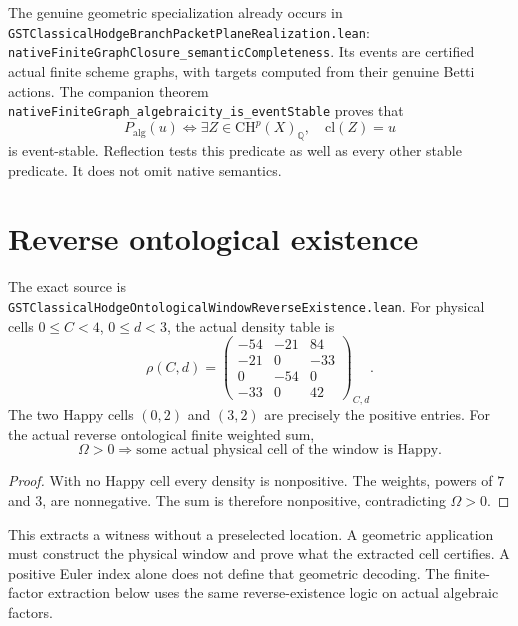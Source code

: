 \documentclass[11pt]{article}
\newcommand{\Q}{\mathbb Q}
\newcommand{\CH}{\mathrm{CH}}
\newcommand{\cl}{\mathrm{cl}}
\begin{document}
The genuine geometric specialization already occurs in
\texttt{GSTClassicalHodgeBranchPacketPlaneRealization.lean}:
\texttt{nativeFiniteGraphClosure\_semanticCompleteness}.
Its events are certified actual finite scheme graphs, with targets
computed from their genuine Betti actions.
The companion theorem
\texttt{nativeFiniteGraph\_algebraicity\_is\_eventStable}
proves that
\[
 P_{\mathrm{alg}}(u)
   \iff \exists Z\in\CH^p(X)_\Q,\quad \cl(Z)=u                 \tag{2}
\]
is event-stable. Reflection tests this predicate as well as every
other stable predicate. It does not omit native semantics.

\section{Reverse ontological existence}
The exact source is
\texttt{GSTClassicalHodgeOntologicalWindowReverseExistence.lean}.
For physical cells $0\le C<4$, $0\le d<3$, the actual density table is
\[
 \rho(C,d)=
 \begin{pmatrix}
 -54&-21&84\\
 -21&0&-33\\
 0&-54&0\\
 -33&0&42
 \end{pmatrix}_{C,d}.
\]
The two Happy cells $(0,2)$ and $(3,2)$ are precisely the positive
entries. For the actual reverse ontological finite weighted sum,
\[
 \boxed{\Omega>0\Longrightarrow
    \text{some actual physical cell of the window is Happy}.}    \tag{3}
\]
\begin{proof}
With no Happy cell every density is nonpositive.
The weights, powers of $7$ and $3$, are nonnegative.
The sum is therefore nonpositive, contradicting $\Omega>0$.
\end{proof}
This extracts a witness without a preselected location. A geometric
application must construct the physical window and prove what the
extracted cell certifies. A positive Euler index alone does not
define that geometric decoding. The finite-factor extraction below
uses the same reverse-existence logic on actual algebraic factors.
\end{document}
